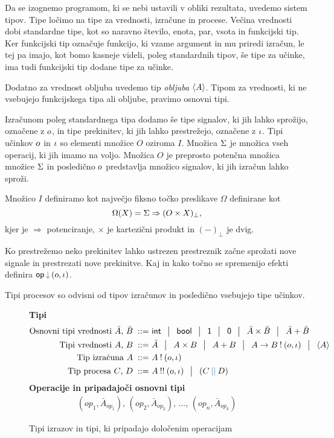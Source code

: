 Da se izognemo programom, ki se nebi ustavili v obliki rezultata, uvedemo sistem tipov.
Tipe ločimo na tipe za vrednosti, izračune in procese.
Večina vrednosti dobi standardne tipe, kot so naravno število, enota, par, vsota in funkcijski tip. 
Ker funkcijski tip označuje funkcijo, ki vzame argument in mu priredi izračun, le tej pa imajo, kot bomo kasneje videli, poleg standardnih tipov, še tipe za učinke, ima tudi funkcijski tip dodane tipe za učinke.

Dodatno za vrednost obljuba uvedemo tip \emph{obljuba} $\langle A \rangle$. 
Tipom za vrednosti, ki ne vsebujejo funkcijskega tipa ali obljube, pravimo osnovni tipi. 


Izračunom poleg standardnega tipa dodamo še tipe signalov, ki jih lahko sprožijo, označene z $o$, in tipe prekinitev, ki jih lahko prestrežejo, označene z $\iota$.
Tipi učinkov $o$ in $\iota$ so elementi množice $O$ oziroma $I$.
Množica $\Sigma$ je množica vseh operacij, ki jih imamo na voljo.
Množica $O$ je preprosto potenčna množica množice $\Sigma$ in posledično $o$ predstavlja množico signalov, ki jih izračun lahko sproži.

Množico $I$ definiramo kot največjo fiksno točko preslikave $\Omega$ definirane kot 
$$\Omega(X) = \Sigma \Rightarrow (O \times X)_\bot ,$$
kjer je $\Rightarrow$ potenciranje, $\times$ je kartezični produkt in $(-)_\bot$ je dvig.

Ko prestrežemo neko prekinitev lahko ustrezen prestreznik začne sprožati nove signale in prestrezati nove prekinitve.
Kaj in kako točno se spremenijo efekti definira $\opincomp{op}{(\o, \i)}$.



Tipi procesov so odvisni od tipov izračunov in posledično vsebujejo tipe učinkov.


\begin{figure}[H]
	\centering
	\small
	\textbf{Tipi}
	\begin{align*}
	\text{Osnovni tipi vrednosti $\bar{A}$, $\bar{B}$}
	\bnfis & \tysym{int} \,\bnfor\! \tysym{bool} \,\bnfor\! \tyunit \,\bnfor\! \tyempty \,\bnfor\! \typrod{\bar{A}}{\bar{B}} \,\bnfor\! \tysum{\bar{A}}{\bar{B}}
	\\%
	\text{Tipi vrednosti $A$, $B$}
	\bnfis & \bar{A} \, \bnfor\! \typrod{A}{B} \,\bnfor\! \tysum{A}{B} \,\bnfor\! \tyfun{A}{\tycomp{B}{\o,\i}} \,\bnfor\! \typromise{A}
	\\
	\text{Tip izračuna $A$} \bnfis& \tycomp{A}{\o,\i}
	\\
	\text{Tip procesa $\tyC$, $\tyD$}  \bnfis & \tyrun{A}{\o, \i} \,\bnfor\! \typar{\tyC}{\tyD}
	\end{align*}
	\textbf{Operacije in pripadajoči osnovni tipi}
	\begin{align*}
		(op_1, \bar{A}_{op_1}),\, (op_2, \bar{A}_{op_2}),\, ... ,\, (op_n, \bar{A}_{op_k})
	\end{align*}
	\caption{Tipi izrazov in tipi, ki pripadajo določenim operacijam}
	\label{fig:tipi}
\end{figure}

